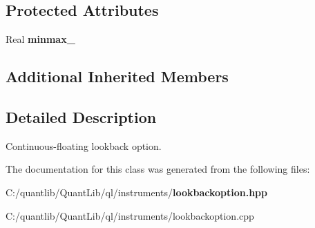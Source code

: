 \subsection*{Protected Attributes}
\begin{DoxyCompactItemize}
\item 
Real {\bfseries minmax\+\_\+}\label{class_quant_lib_1_1_continuous_floating_lookback_option_aec3359fbe9658a3aa1c6d61ea90dd17d}

\end{DoxyCompactItemize}
\subsection*{Additional Inherited Members}


\subsection{Detailed Description}
Continuous-\/floating lookback option. 



The documentation for this class was generated from the following files\+:\begin{DoxyCompactItemize}
\item 
C\+:/quantlib/\+Quant\+Lib/ql/instruments/{\bf lookbackoption.\+hpp}\item 
C\+:/quantlib/\+Quant\+Lib/ql/instruments/lookbackoption.\+cpp\end{DoxyCompactItemize}
